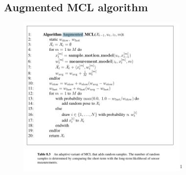 \documentclass{article}
\begin{document}
\subsection{Augmented MCL algorithm}
    \begin{figure}
        \centering
        \includegraphics[height = 80mm]{./Augmented.png}$^{1}$
    \end{figure}
\end{document}
